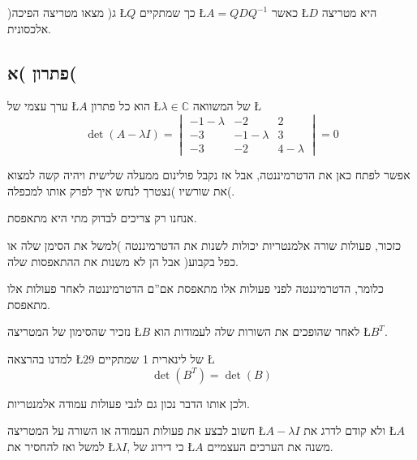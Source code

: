 \documentclass[english,hebrew]{article}
\begin{document}
)ג( מצאו מטריצה הפיכה \L{$Q$} כך שמתקיים \L{$A=QDQ^{-1}$} כאשר \L{$D$}
היא מטריצה אלכסונית.

\subsection{פתרון )א(}

ערך עצמי של \L{$A$} הוא כל פתרון \L{$\lambda\in\mathbb{C}$} של המשוואה
\L{%
\[
\det\left(A-\lambda I\right)=\begin{vmatrix}-1-\lambda & -2 & 2\\
-3 & -1-\lambda & 3\\
-3 & -2 & 4-\lambda
\end{vmatrix}=0
\]
}%

אפשר לפתח כאן את הדטרמיננטה, אבל אז נקבל פולינום ממעלה שלישית ויהיה
קשה למצוא את שורשיו )נצטרך לנחש איך לפרק אותו למכפלה(.

אנחנו רק צריכים לבדוק מתי היא מתאפסת.

כזכור, פעולות שורה אלמנטריות יכולות לשנות את הדטרמיננטה )למשל את הסימן
שלה או כפל בקבוע( אבל הן לא משנות את ההתאפסות שלה.

כלומר, הדטרמיננטה לפני פעולות אלו מתאפסת אם\textquotedblright ם הדטרמיננטה
לאחר פעולות אלו מתאפסת.

נזכיר שהסימון של המטריצה \L{$B$} לאחר שהופכים את השורות שלה לעמודות
הוא \L{$B^{T}$}.

למדנו בהרצאה \L{$29$} של לינארית 1 שמתקיים \L{%
\[
\det\left(B^{T}\right)=\det\left(B\right)
\]
}%

ולכן אותו הדבר נכון גם לגבי פעולות עמודה אלמנטריות.

חשוב לבצע את פעולות העמודה או השורה על המטריצה \L{$A-\lambda I$}
ולא קודם לדרג את \L{$A$} למשל ואז להחסיר את \L{$\lambda I$}, כי
דירוג של \L{$A$} משנה את הערכים העצמיים.
\end{document}
